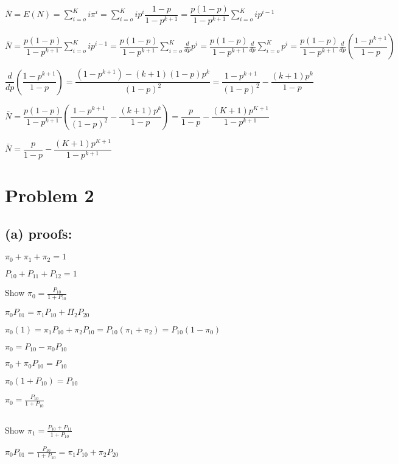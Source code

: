 \documentclass[12pt]{article}
\begin{document}
$\bar{N} = E(N) = \displaystyle \sum_{i = o}^{K} i\pi^i  =  \displaystyle \sum_{i = o}^{K} ip^i\dfrac {1-p} {1-p^{k+1}} =  \dfrac {p(1-p)} {1-p^{k+1}}\displaystyle \sum_{i = o}^{K} ip^{i-1} $

$\bar{N} =  \dfrac {p(1-p)} {1-p^{k+1}}\displaystyle \sum_{i = o}^{K} ip^{i-1} =  \dfrac {p(1-p)} {1-p^{k+1}}\displaystyle \sum_{i = o}^{K} \frac d {dp}p^{i} =  \dfrac {p(1-p)} {1-p^{k+1}}\frac d {dp}\displaystyle \sum_{i = o}^{K} p^{i} =  \dfrac {p(1-p)} {1-p^{k+1}}\frac d {dp}\displaystyle (\dfrac {1-p^{k+1}} {1-p}) $

$$\displaystyle\frac d {dp}\displaystyle (\dfrac {1-p^{k+1}} {1-p}) = \displaystyle \dfrac {(1-p^{k+1}) - (k+1)(1-p)p^k} {(1-p)^2} = \dfrac {1-p^{k+1}} {(1-p)^2} - \dfrac {(k+1)p^{k}} {1-p}$$

$\bar{N} =  \dfrac {p(1-p)} {1-p^{k+1}}  \displaystyle(\dfrac {1-p^{k+1}} {(1-p)^2} - \dfrac {(k+1)p^{k}} {1-p}) = \dfrac {p} {1-p} - \dfrac {(K+1)p^{K+1}} {1-p^{k+1}}$

$\bar{N} = \dfrac {p} {1-p} - \dfrac {(K+1)p^{K+1}} {1-p^{k+1}}$


  \pagebreak

  \section*{Problem 2 }   
    \subsection*{(a) proofs:} 
  \begin{center}
  $\pi_0+\pi_1+\pi_2=1$ 

  $P_{10}+P_{11}+P_{12}=1$
  \end{center}

  Show  $\pi_0 = \frac{P_{10}}{1+P_{10}}$
  
  $\pi_0P_{01} = \pi_1P_{10} + \Pi_2P_{20}$
  
$\pi_0(1) = \pi_1P_{10}+\pi_2P_{10} = P_{10}(\pi_1+\pi_2) = P_{10}(1-\pi_0)  $

$\pi_0 = P_{10}-\pi_0P_{10}  $

$\pi_0+\pi_0P_{10} = P_{10}  $

$\pi_0\left(1+P_{10}\right) = P_{10}$

$\pi_0 = \frac{P_{10}}{1+P_{10}}$

${ }$

Show  $\pi_1 = \frac{P_{10}+P_{11}}{1+P_{10}}$

 $\pi_0P_{01} = \frac{P_{10}}{1+P_{10}} = \pi_1P_{10} + \pi_2P_{20}$
\end{document}
